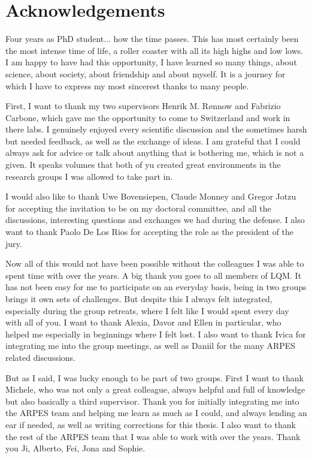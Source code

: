 \chapter*{Acknowledgements}
Four years as PhD student... how the time passes.
This has most certainly been the most intense time of life, a roller coaster with all its high highs and low lows.
I am happy to have had this opportunity, I have learned so many things, about science, about society, about friendship and about myself.
It is a journey for which I have to express my most sincerest thanks to many people.\hfill\break

First, I want to thank my two supervisors Henrik M. R{\o}nnow and Fabrizio Carbone, which gave me the opportunity to come to Switzerland and work in there labs.
I genuinely enjoyed every scientific discussion and the sometimes harsh but needed feedback, as well as the exchange of ideas.
I am grateful that I could always ask for advice or talk about anything that is bothering me, which is not a given.
It speaks volumes that both of yu created great environments in the research groups I was allowed to take part in.\hfill\break

I would also like to thank Uwe Bovensiepen, Claude Monney and Gregor Jotzu for accepting the invitation to be on my doctoral committee, and all the discussions, interesting questions and exchanges we had during the defense.
I also want to thank Paolo De Los Rios for accepting the role as the president of the jury.\hfill\break

Now all of this would not have been possible without the colleagues I was able to spent time with over the years.
A big thank you goes to all members of LQM.
It has not been easy for me to participate on an everyday basis, being in two groups brings it own sets of challenges.
But despite this I always felt integrated, especially during the group retreats, where I felt like I would spent every day with all of you.
I want to thank Alexia, Davor and Ellen in particular, who helped me especially in beginnings where I felt lost.
I also want to thank Ivica for integrating me into the group meetings, as well as Daniil for the many ARPES related discussions.\hfill\break

But as I said, I was lucky enough to be part of two groups.
First I want to thank Michele, who was not only a great colleague, always helpful and full of knowledge but also basically a third supervisor.
Thank you for initially integrating me into the ARPES team and helping me learn as much as I could, and always lending an ear if needed, as well as writing corrections for this thesis. I also want to thank the rest of the ARPES team that I was able to work with over the years. Thank you Ji, Alberto, Fei, Jona and Sophie.

